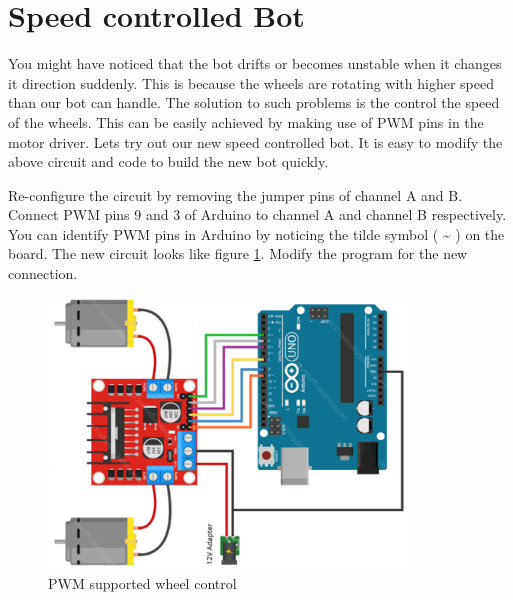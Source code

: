 \section{Speed controlled Bot}
\label{section:speed_controlled_bot}

\par You might have noticed that the bot drifts or becomes unstable when it changes it direction suddenly. This is because the wheels are rotating with higher speed than our bot can handle. The solution to such problems is the control the speed of the wheels. This can be easily achieved by making use of \ac{PWM} pins in the motor driver. Lets try out our new speed controlled bot. It is easy to modify the above circuit and code to build the new bot quickly.

\par Re-configure the circuit by removing the jumper pins of channel A and B. Connect \ac{PWM} pins 9 and 3 of Arduino to channel A and channel B respectively. You can identify \ac{PWM} pins in Arduino by noticing the tilde symbol ( \textasciitilde{} ) on the board. The new circuit looks like figure \ref{fig:speed_controlled}. Modify the program for the new connection.

\begin{figure}
    \centering
    \includegraphics[width=3.8in]{Images/Motor_Driver/speed_bot.png}
    \caption{PWM supported wheel control}
    \label{fig:speed_controlled}
\end{figure}

